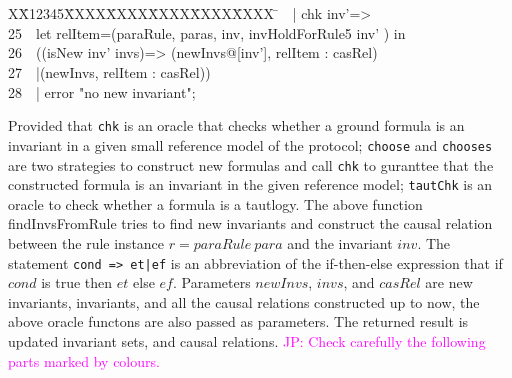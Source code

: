\documentclass{llncs}
\newlength{\fminilength}
\newenvironment{fmini}[1][\linewidth]
  {\setlength{\fminilength}{#1\fboxsep-2\fboxrule}%
   \vspace{2ex}\noindent\begin{lrbox}{\fminibox}\begin{minipage}{\fminilength}%
   \mbox{ }\hfill\vspace{-2.5ex}}%
  {\end{minipage}\end{lrbox}\vspace{1ex}\hspace{0ex}%
   \framebox{\usebox{\fminibox}}}
\newenvironment{specification}
{\noindent\scriptsize
\tt\begin{fmini}\begin{tabbing}X\=X12345\=XXXX\=XXXX\=XXXX\=XXXX\=XXXX
\=\+\kill} {\end{tabbing}\normalfont\end{fmini}}
\def \twoSpaces {\ \ }
\newcommand\JP[1]{\textcolor{magenta}{JP: #1}}
\begin{document}
\begin{specification}
24\twoSpaces   | chk inv'=>\\
25\twoSpaces      let relItem=(paraRule, paras, inv,  invHoldForRule5 inv'  ) in\\
26\twoSpaces        ((isNew inv' invs)=>        (newInvs@[inv'], relItem : casRel)\\
27\twoSpaces        |(newInvs,  relItem : casRel))\\
28\twoSpaces   | error "no new invariant";\\
\end{specification}

Provided that  {\tt chk} is an oracle that checks whether a ground
formula is an invariant in a given small reference model of the
protocol; {\tt choose} and {\tt chooses} are two strategies to
construct new formulas and call {\tt chk} to guranttee that the
constructed formula is an invariant in the given  reference model;
{\tt tautChk} is an oracle to check whether a formula is a tautlogy.
  The above function {\sf findInvsFromRule} tries to find new
invariants and construct the causal relation between the rule
instance $r=paraRule~ para$ and the invariant $inv$. The statement
{\tt cond => et|ef} is an abbreviation of the if-then-else
expression that if $cond$ is true then $et$ else $ef$. Parameters
$newInvs$, $invs$, and $casRel$ are new invariants, invariants, and
all the causal relations constructed up to now, the above oracle
functons are also passed as parameters. The returned result is
updated invariant sets, and causal relations. \JP{Check carefully
the following parts marked by colours.}
%
\end{document}
